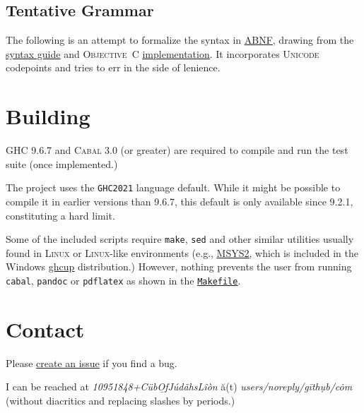 \documentclass[11pt]{article}
\newcommand{\link}[2]{\underline{\color{darkblue}\href{#1}{#2}}}
\begin{document}
  \subsection*{Tentative Grammar}
  The following is an attempt to formalize the syntax in
  \link{https://datatracker.ietf.org/doc/html/rfc5234}{\textsc{ABNF}},
  drawing from the \link{https://fountain.io/syntax/}{syntax guide} and
  \textsc{Objective~C}
  \link{https://github.com/nyousefi/Fountain}{implementation}.
  It incorporates \textsc{Unicode} codepoints and tries to err in the
  side of lenience.
  
  

\section*{Building}
\textsc{GHC} 9.6.7 and \textsc{Cabal} 3.0 (or greater) are required to
compile and run the test suite (once implemented.)

The project uses the \texttt{GHC2021} language default. While it might
be possible to compile it in earlier versions than 9.6.7, this default
is only available since 9.2.1, constituting a hard limit.

Some of the included scripts require \texttt{make}, \texttt{sed} and
other similar utilities usually found in \textsc{Linux} or
\textsc{Linux}-like environments (e.g.,
\link{https://www.msys2.org/}{\textsc{MSYS2}}, which is included in
the Windows \link{}{ghcup} distribution.) However, nothing
prevents the user from running \texttt{cabal}, \texttt{pandoc} or
\texttt{pdflatex} as shown in the
\link{run:./Makefile}{\texttt{Makefile}}.

\section*{Contact} Please
\link{https://github.com/CubOfJudahsLion/fountain-parser/issues}{create an issue}
if you find a bug.

I can be reached at
\textrm{\emph{10951848+C\"{u}b\b{O}fJ\'{u}d\~{a}hsL\^{i}\`{o}n} \u{a}(t)
\emph{users/noreply/g\={i}th\d{u}b/c\.{o}m}} (without diacritics and
replacing slashes by periods.)
\end{document}
